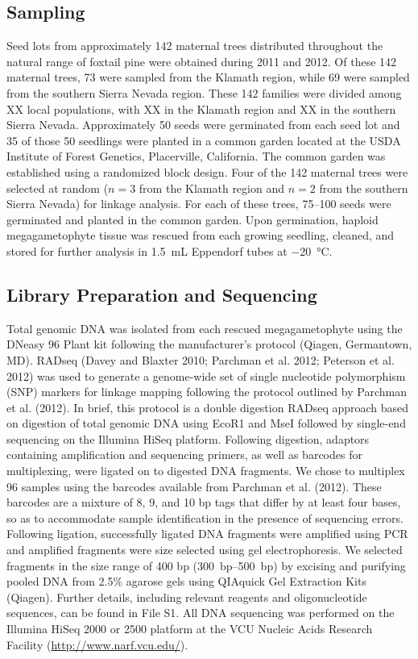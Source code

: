 \documentclass[11pt]{article}
\begin{document}
\subsection{Sampling}
Seed lots from approximately 142 maternal trees distributed throughout the natural range 
of foxtail pine were obtained during 2011 and 2012. Of these 142 maternal trees, 73 were sampled from the 
Klamath region, while 69 were sampled from the southern Sierra Nevada region. These 142 families were
divided among XX local populations, with XX in the Klamath region and XX in the southern Sierra Nevada.
Approximately 50 seeds were germinated from each seed lot and 35 of those 50 seedlings were planted in a 
common garden located at the USDA Institute of Forest Genetics, Placerville, California. The 
common garden was established using a randomized block design.
Four of the 142 maternal trees were selected at random ($n = 3$ from the Klamath region and $n = 2$ from 
the southern Sierra Nevada) for linkage analysis. For each of these trees, \SIrange{75}{100}{} 
seeds were germinated and planted in the common garden. Upon germination, haploid 
megagametophyte tissue was rescued from each growing seedling, cleaned, and stored for further 
analysis in \SI{1.5}{\mL} Eppendorf tubes at \SI{-20}{\celsius}.


\subsection*{Library Preparation and Sequencing}
Total genomic DNA was isolated from each rescued megagametophyte using the DNeasy 96 Plant 
kit following the manufacturer’s protocol (Qiagen, Germantown, MD). RADseq (Davey and Blaxter 2010; Parchman et al. 2012; Peterson et al. 2012) 
was used to generate a genome-wide set of 
single nucleotide polymorphism (SNP) markers for linkage mapping following the protocol 
outlined by Parchman et al. (2012). In brief, this protocol is a double digestion RADseq 
approach based on digestion of total genomic DNA using EcoR1 and MseI followed by single-end 
sequencing on the Illumina HiSeq platform. Following digestion, adaptors 
containing amplification and sequencing primers, as well as barcodes for multiplexing, 
were ligated on to digested DNA fragments. We chose to multiplex 96 samples using the 
barcodes available from Parchman et al. (2012). These barcodes are a mixture of 8, 9, and 
10 bp tags that differ by at least four bases, so as to accommodate sample identification in the 
presence of sequencing errors. Following ligation, successfully ligated DNA fragments were 
amplified using PCR and amplified fragments were size selected using gel electrophoresis. We selected 
fragments in the size range of 400 bp (\SIrange{300}{500}{bp}) by excising and purifying pooled DNA from 2.5\% 
agarose gels using QIAquick Gel Extraction Kits (Qiagen). Further details, including relevant reagents and 
oligonucleotide sequences, can be found in File S1. All DNA sequencing was performed on the Illumina HiSeq 2000 or 2500
platform at the VCU Nucleic Acids Research Facility (\url{http://www.narf.vcu.edu/}).
\end{document}
